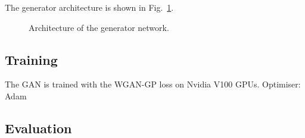 The generator architecture is shown in Fig.~\ref{fig:gen_arch}.

\begin{figure}
    \centering
    \caption{Architecture of the generator network.}
    \label{fig:gen_arch}
\end{figure}

\subsection{Training}

The GAN is trained with the WGAN-GP loss on Nvidia V100 GPUs.
Optimiser: Adam

\subsection{Evaluation}









